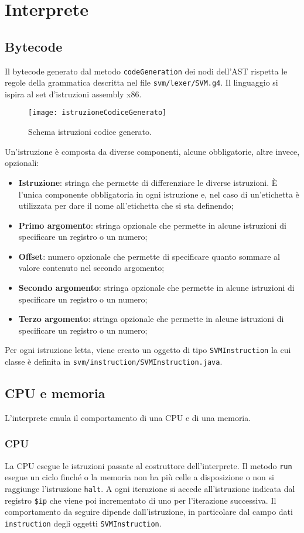 \documentclass[../main.tex]{subfiles}
\begin{document}
\chapter{Interprete}\label{c:interprete}
\section{Bytecode}\label{s:bytecode}
Il bytecode generato dal metodo \verb|codeGeneration| dei nodi dell'AST rispetta le regole della grammatica descritta nel file \verb|svm/lexer/SVM.g4|. Il linguaggio si ispira al set d'istruzioni assembly x86. 
\begin{figure}[H]
    \centering
    \texttt{[image: istruzioneCodiceGenerato]}
    \caption{Schema istruzioni codice generato.}
    \label{fig:istruzione-codice-generato}
\end{figure}
Un'istruzione \`e composta da diverse componenti, alcune obbligatorie, altre invece, opzionali:
\begin{itemize}
    \item \textbf{Istruzione}: stringa che permette di differenziare le diverse istruzioni. \`E l'unica componente obbligatoria in ogni istruzione e, nel caso di un'etichetta \`e utilizzata per dare il nome all'etichetta che si sta definendo;
    \item \textbf{Primo argomento}: stringa opzionale che permette in alcune istruzioni di specificare un registro o un numero;
    \item \textbf{Offset}: numero opzionale che permette di specificare quanto sommare al valore contenuto nel secondo argomento;
    \item \textbf{Secondo argomento}: stringa opzionale che permette in alcune istruzioni di specificare un registro o un numero;
    \item \textbf{Terzo argomento}: stringa opzionale che permette in alcune istruzioni di specificare un registro o un numero;
\end{itemize}
Per ogni istruzione letta, viene creato un oggetto di tipo \verb|SVMInstruction| la cui classe \`e definita in \verb|svm/instruction/SVMInstruction.java|.
\section{CPU e memoria}\label{s:cpu-e-memoria}
L'interprete emula il comportamento di una CPU e di una memoria.
\subsection{CPU}
La CPU esegue le istruzioni passate al costruttore dell'interprete. Il metodo \verb|run| esegue un ciclo finch\'e o la memoria non ha pi\`u celle a disposizione o non si raggiunge l'istruzione \verb|halt|. A ogni iterazione si accede all'istruzione indicata dal registro \verb|$ip| che viene poi incrementato di uno per l'iterazione successiva. Il comportamento da seguire dipende dall'istruzione, in particolare dal campo dati \verb|instruction| degli oggetti \verb|SVMInstruction|.
\end{document}
